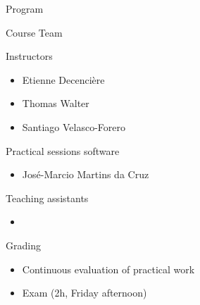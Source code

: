\documentclass[xcolor=pdftex,dvipsnames,table,mathserif]{beamer}
\begin{document}
\begin{frame}{Program}
\end{frame}


\begin{frame}{Course Team}

  {\scriptsize
    \begin{block}{Instructors}
      \begin{itemize}
      \item Etienne Decencière
      \item Thomas Walter
      \item Santiago Velasco-Forero
      \end{itemize}
    \end{block}

    \begin{block}{Practical sessions software}
      \begin{itemize}
      \item José-Marcio Martins da Cruz
      \end{itemize}
    \end{block}

    \begin{block}{Teaching assistants}
      \begin{itemize}
      \item
      \end{itemize}
    \end{block}

    }

\end{frame}

\begin{frame}{Grading}

\begin{itemize}
\item Continuous evaluation of practical work
\item Exam (2h, Friday afternoon)
\end{itemize}

\end{frame}
\end{document}

